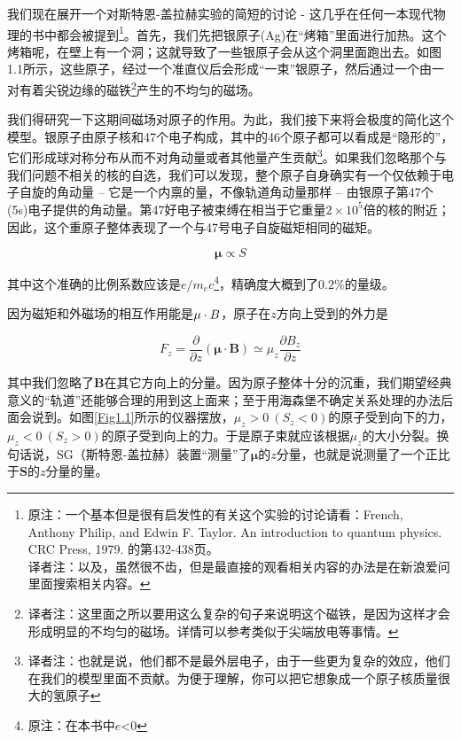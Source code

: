 \documentclass[UTF8,twoside]{ctexart}
\begin{document}
\noindent 我们现在展开一个对斯特恩-盖拉赫实验的简短的讨论 - 这几乎在任何一本现代物理的书中都会被提到\footnote{原注：一个基本但是很有启发性的有关这个实验的讨论请看：French, Anthony Philip, and Edwin F. Taylor. An introduction to quantum physics. CRC Press, 1979. 的第432-438页。\\ 译者注：以及，虽然很不齿，但是最直接的观看相关内容的办法是在新浪爱问里面搜索相关内容。 }。首先，我们先把银原子(Ag)在“烤箱”里面进行加热。这个烤箱呢，在壁上有一个洞；这就导致了一些银原子会从这个洞里面跑出去。如图1.1所示，这些原子，经过一个准直仪后会形成“一束”银原子，然后通过一个由一对有着尖锐边缘的磁铁\footnote{译者注：这里面之所以要用这么复杂的句子来说明这个磁铁，是因为这样才会形成明显的不均匀的磁场。详情可以参考类似于尖端放电等事情。}产生的不均匀的磁场。

我们得研究一下这期间磁场对原子的作用。为此，我们接下来将会极度的简化这个模型。银原子由原子核和47个电子构成，其中的46个原子都可以看成是“隐形的”，它们形成球对称分布从而不对角动量或者其他量产生贡献\footnote{译者注：也就是说，他们都不是最外层电子，由于一些更为复杂的效应，他们在我们的模型里面不贡献。为便于理解，你可以把它想象成一个原子核质量很大的氢原子}。如果我们忽略那个与我们问题不相关的核的自选，我们可以发现，整个原子自身确实有一个仅依赖于电子自旋的角动量 -- 它是一个内禀的量，不像轨道角动量那样 -- 由银原子第47个(5s)电子提供的角动量。第47好电子被束缚在相当于它重量$2\times 10^5$倍的核的附近；因此，这个重原子整体表现了一个与47号电子自旋磁矩相同的磁矩。

\begin{equation}
{\bm{\mu}} \propto S
\end{equation}

\noindent 其中这个准确的比例系数应该是$e/m_e c$\footnote{原注：在本书中$e$<0}，精确度大概到了$0.2\%$的量级。

因为磁矩和外磁场的相互作用能是$\boldmath{\mu \cdot B}$，原子在$z$方向上受到的外力是

\begin{equation}
F_z = \frac{\partial}{\partial z}\left(\bm{ \mu \cdot B} \right) \simeq \mu_z \frac{\partial B_z}{\partial z}
\end{equation}

\noindent 其中我们忽略了$\bm{B}$在其它方向上的分量。因为原子整体十分的沉重，我们期望经典意义的“轨道”还能够合理的用到这上面来；至于用海森堡不确定关系处理的办法后面会说到。如图{\ref{Fig1.1}}所示的仪器摆放，$\mu_z > 0\ \left(S_z < 0\right)$的原子受到向下的力，$\mu_z < 0\ \left(S_z > 0\right)$的原子受到向上的力。于是原子束就应该根据$\mu_z$的大小分裂。换句话说，SG（斯特恩-盖拉赫）装置“测量”了$\bm \mu$的$z$分量，也就是说测量了一个正比于$\bm S$的$z$分量的量。
\end{document}
